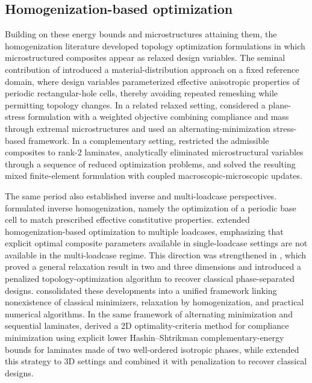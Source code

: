 \documentclass[preprint,3p]{elsarticle}
\begin{document}
\subsection{Homogenization-based optimization}\label{sec:intro_homogenization}
Building on these energy bounds and microstructures attaining them, the homogenization literature developed topology optimization formulations in which microstructured composites appear as relaxed design variables. The seminal contribution of \citet{Bendose1988} introduced a material-distribution approach on a fixed reference domain, where design variables parameterized effective anisotropic properties of periodic rectangular-hole cells, thereby avoiding repeated remeshing while permitting topology changes. In a related relaxed setting, \citet{Allaire1993od} considered a plane-stress formulation with a weighted objective combining compliance and mass through extremal microstructures and used an alternating-minimization stress-based framework. In a complementary setting, \citet{Jog1994} restricted the admissible composites to rank-2 laminates, analytically eliminated microstructural variables through a sequence of reduced optimization problems, and solved the resulting mixed finite-element formulation with coupled macroscopic-microscopic updates.

The same period also established inverse and multi-loadcase perspectives. \citet{Sigmund1994} formulated inverse homogenization, namely the optimization of a periodic base cell to match prescribed effective constitutive properties. \citet{Allaire1996} extended homogenization-based optimization to multiple loadcases, emphasizing that explicit optimal composite parameters available in single-loadcase settings are not available in the multi-loadcase regime. This direction was strengthened in \citep{allaire1997shape}, which proved a general relaxation result in two and three dimensions and introduced a penalized topology-optimization algorithm to recover classical phase-separated designs. \citet{Allaire2002} consolidated these developments into a unified framework linking nonexistence of classical minimizers, relaxation by homogenization, and practical numerical algorithms. In the same framework of alternating minimization and sequential laminates, \citet{Burazin2021} derived a 2D optimality-criteria method for compliance minimization using explicit lower Hashin--Shtrikman complementary-energy bounds for laminates made of two well-ordered isotropic phases, while \citet{Burazin2023} extended this strategy to 3D settings and combined it with penalization to recover classical designs.
\end{document}
